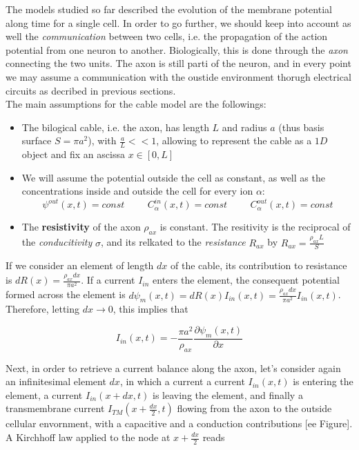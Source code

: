 \documentclass[a4paper]{article}
\begin{document}
The models studied so far described the evolution of the membrane potential along time for a single cell. In order to go further, we should keep into account as well the \textit{communication} between two cells, i.e. the propagation of the action potential from one neuron to another. Biologically, this is done through the \textit{axon} connecting the two units. The axon is still parti of the neuron, and in every point we may assume a communication with the oustide environment thorugh electrical circuits as decribed in previous sections.\\
The main assumptions for the cable model are the followings:

\begin{itemize}
	
	\item The bilogical cable, i.e. the axon, has length $L$ and radius $a$ (thus basis surface $S=\pi a^2$), with $\frac{a}{L} << 1$, allowing to represent the cable as a $1D$ object and fix an ascissa $ x \in [0,L]$
	
	\item We will assume the potential outside the cell as constant, as well as the concentrations inside and outside the cell for every ion $\alpha$: 
	$$ \psi^{out}(x,t) = const  \hspace{1cm} C_\alpha^{in}(x,t)  = const \hspace{1cm} C_\alpha^{out}(x,t)  = const$$
	
	\item The \textbf{resistivity} of the axon $\rho_{ax}$ is constant. The resitivity is the reciprocal of the \textit{conducitivity} $\sigma$, and its relkated to the \textit{resistance} $R_{ax}$ by $ R_{ax} = \frac{\rho_{ax} L}{S}$
	
	
\end{itemize}


If we consider an element of length $dx$ of the cable, its contribution to resistance is $dR(x) = \frac{\rho_{ax} dx}{\pi a^2}$. If a current $I_{in}$ enters the element, the consequent potential formed across the element is $ d\psi_m(x,t) = dR(x)I_{in}(x,t) = \frac{\rho_{ax} dx}{\pi a^2} I_{in}(x,t)$. Therefore, letting $dx \rightarrow 0$, this implies that

\begin{equation}
I_{in}(x,t) = -\frac{\pi a^2}{\rho_{ax}}\frac{\partial \psi_m(x,t)}{\partial x}
\end{equation}

Next, in order to retrieve a current balance along the axon, let's consider again an infinitesimal element $dx$, in which a current a current $I_{in}(x,t)$ is entering the element, a current $I_{in}(x+dx,t)$ is leaving the element, and finally a transmembrane current $I_{TM}(x+\frac{dx}{2},t)$ flowing from the axon to the outside cellular envornment, with a capacitive and a conduction contributions [ee Figure].\\
A Kirchhoff law applied to the node at $x+\frac{dx}{2}$ reads
\end{document}
